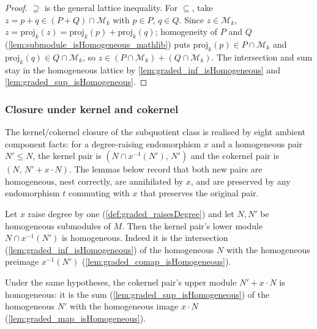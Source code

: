\begin{proof}
    \leanok
  \(\supseteq\) is the general lattice inequality. For \(\subseteq\), take \(z = p +
  q \in (P + Q) \cap \mathcal{M}_k\) with \(p \in P\), \(q \in Q\). Since \(z \in
  \mathcal{M}_k\), \(z = \mathrm{proj}_k(z) = \mathrm{proj}_k(p) +
  \mathrm{proj}_k(q)\); homogeneity of \(P\) and \(Q\)
  (\cref{lem:submodule_isHomogeneous_mathlib}) puts \(\mathrm{proj}_k(p) \in P \cap
  \mathcal{M}_k\) and \(\mathrm{proj}_k(q) \in Q \cap \mathcal{M}_k\), so \(z \in (P
  \cap \mathcal{M}_k) + (Q \cap \mathcal{M}_k)\). The intersection and sum stay in
  the homogeneous lattice by \cref{lem:graded_inf_isHomogeneous} and
  \cref{lem:graded_sup_isHomogeneous}.
\end{proof}

\subsubsection*{Closure under kernel and cokernel}

The kernel/cokernel closure of the subquotient class is realised by eight ambient
component facts: for a degree-raising endomorphism \(x\) and a homogeneous pair
\(N' \le N\), the kernel pair is \((N \cap x^{-1}(N'),\, N')\) and the cokernel pair is
\((N,\, N' + x \cdot N)\). The lemmas below record that both new pairs are homogeneous,
nest correctly, are annihilated by \(x\), and are preserved by any endomorphism \(t\)
commuting with \(x\) that preserves the original pair.

\begin{lemma}
  \label{lem:graded_ker_isHomogeneous}
  Let \(x\) raise degree by one (\cref{def:graded_raisesDegree}) and let \(N, N'\) be
  homogeneous submodules of \(M\). Then the kernel pair's lower module
  \(N \cap x^{-1}(N')\) is homogeneous. Indeed it is the intersection
  (\cref{lem:graded_inf_isHomogeneous}) of the homogeneous \(N\) with the homogeneous
  preimage \(x^{-1}(N')\) (\cref{lem:graded_comap_isHomogeneous}).
\end{lemma}

\begin{lemma}
  \label{lem:graded_coker_isHomogeneous}
  Under the same hypotheses, the cokernel pair's upper module \(N' + x \cdot N\) is
  homogeneous: it is the sum (\cref{lem:graded_sup_isHomogeneous}) of the homogeneous
  \(N'\) with the homogeneous image \(x \cdot N\)
  (\cref{lem:graded_map_isHomogeneous}).
\end{lemma}


